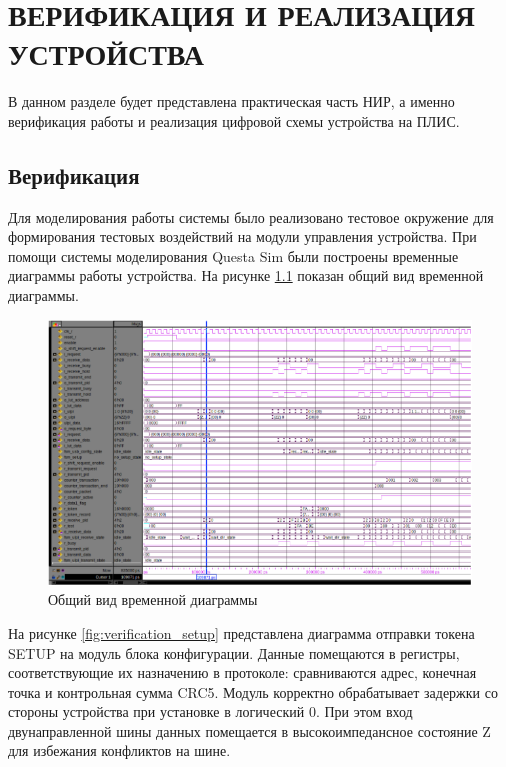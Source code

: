 \chapter{ВЕРИФИКАЦИЯ И РЕАЛИЗАЦИЯ УСТРОЙСТВА}
\label{cha:impl}

В данном разделе будет представлена практическая часть НИР, а именно верификация работы и реализация цифровой схемы устройства на ПЛИС.

\section{Верификация}

Для моделирования работы системы было реализовано тестовое окружение для формирования тестовых воздействий на модули управления устройства. При помощи системы моделирования Questa Sim были построены временные диаграммы работы устройства. На рисунке \ref{fig:verification_all} показан общий вид временной диаграммы.


\begin{figure}[ht]
    \centering
    \includegraphics[scale=0.7]{res/img/verification_all.png}
    \caption{Общий вид временной диаграммы}
    \label{fig:verification_all}
\end{figure}

\pagebreak
На рисунке \ref{fig:verification_setup} представлена диаграмма отправки токена SETUP на модуль блока конфигурации. Данные помещаются в регистры, соответствующие их назначению в протоколе: сравниваются адрес, конечная точка и контрольная сумма CRC5. Модуль корректно обрабатывает задержки со стороны устройства при установке  в логический 0. При этом вход двунаправленной шины данных помещается в высокоимпедансное состояние Z для избежания конфликтов на шине.

